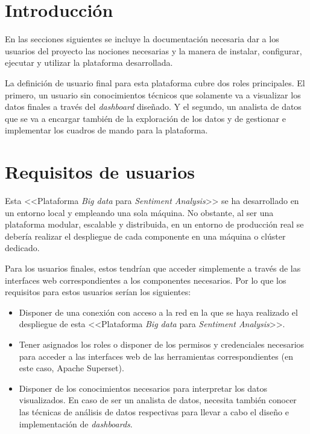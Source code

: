 
\section{Introducción}

En las secciones siguientes se incluye la documentación necesaria dar a los usuarios del proyecto las nociones necesarias y la manera de instalar, configurar, ejecutar y utilizar la plataforma desarrollada.

La definición de usuario final para esta plataforma cubre dos roles principales. El primero, un usuario sin conocimientos técnicos que solamente va a visualizar los datos finales a través del \textit{dashboard} diseñado. Y el segundo, un analista de datos que se va a encargar también de la exploración de los datos y de gestionar e implementar los cuadros de mando para la plataforma.

\section{Requisitos de usuarios}

Esta <<Plataforma \textit{Big data} para \textit{Sentiment Analysis}>> se ha desarrollado en un entorno local y empleando una sola máquina. No obstante, al ser una plataforma modular, escalable y distribuida, en un entorno de producción real se debería realizar el despliegue de cada componente en una máquina o clúster dedicado.

Para los usuarios finales, estos tendrían que acceder simplemente a través de las interfaces web correspondientes a los componentes necesarios. Por lo que los requisitos para estos usuarios serían los siguientes:

\vspace{2cm}

\begin{itemize}
    \item Disponer de una conexión con acceso a la red en la que se haya realizado el despliegue de esta <<Plataforma \textit{Big data} para \textit{Sentiment Analysis}>>.
    \item Tener asignados los roles o disponer de los permisos y credenciales necesarios para acceder a las interfaces web de las herramientas correspondientes (en este caso, Apache Superset).
    \item Disponer de los conocimientos necesarios para interpretar los datos visualizados. En caso de ser un analista de datos, necesita también conocer las técnicas de análisis de datos respectivas para llevar a cabo el diseño e implementación de \textit{dashboards}.
\end{itemize}


